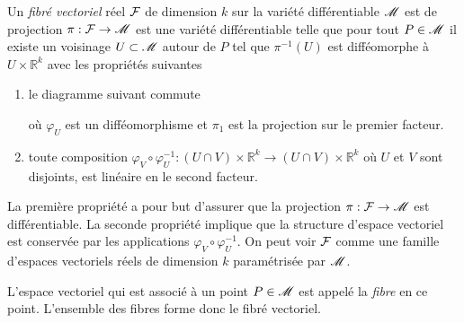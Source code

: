 \documentclass[a4paper,11pt]{report}
\begin{document}
                \begin{definition}
                    Un \textit{fibré vectoriel} réel $\mathcal{F}$ de dimension $k$ sur la variété différentiable $\mathscr{M}$ est de projection $\pi:\mathcal{F}\to\mathscr{M}$ est une variété différentiable telle que pour tout $P\in\mathscr{M}$ il existe un voisinage $U\subset\mathscr{M}$ autour de $P$ tel que $\pi^{-1}(U)$ est difféomorphe à $U\times \mathbb{R}^k$ avec les propriétés suivantes
                    \begin{enumerate}[label = \textit{\roman*)}]
                        \item le diagramme suivant commute
                        \begin{center}
                        \end{center}
                        où $\varphi_U$ est un difféomorphisme et $\pi_1$ est la projection sur le premier facteur.
                        \item toute composition $\varphi_V\circ\varphi_U^{-1} : (U\cap V)\times \mathbb{R}^k\to (U\cap V)\times \mathbb{R}^k$ où $U$ et $V$ sont disjoints, est linéaire en le second facteur.
                    \end{enumerate}
                \end{definition}
                
                La première propriété a pour but d'assurer que la projection $\pi:\mathcal{F}\to\mathscr{M}$ est différentiable. La seconde propriété implique que la structure d'espace vectoriel est conservée par les applications $\varphi_V\circ\varphi_U^{-1}$. On peut voir $\mathcal{F}$ comme une famille d'espaces vectoriels réels de dimension $k$ paramétrisée par $\mathscr{M}$.\\
                
                \begin{definition}
                    L'espace vectoriel qui est associé à un point $P\in\mathscr{M}$ est appelé la \textit{fibre} en ce point. L'ensemble des fibres forme donc le fibré vectoriel.
                \end{definition}
                
\end{document}
